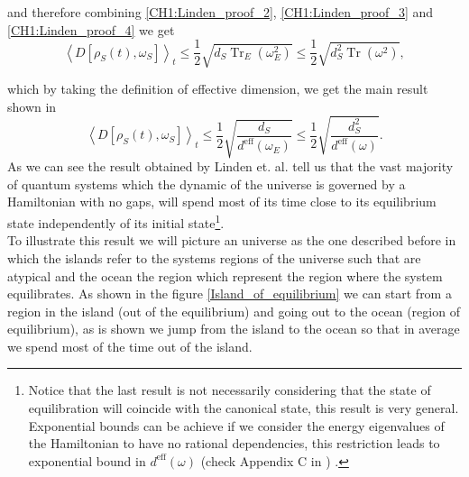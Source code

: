 and therefore combining \eqref{CH1:Linden_proof_2}, \eqref{CH1:Linden_proof_3} and \eqref{CH1:Linden_proof_4} we get
\begin{equation}
\left\langle D\left[\rho_{S}(t), \omega_{S}\right]\right\rangle_{t} \leq \frac{1}{2} \sqrt{d_{S} \operatorname{Tr}_{E}\left(\omega_{E}^{2}\right)} \leq \frac{1}{2} \sqrt{d_{S}^{2} \operatorname{Tr}\left(\omega^{2}\right)},
\label{CH1:Inequality_last}
\end{equation}

which by taking the definition of effective dimension, we get the main result shown in \cite{linden_quantum_2009}
\begin{equation}
\left\langle D\left[\rho_{S}(t), \omega_{S}\right]\right\rangle_{t} \leq \frac{1}{2} \sqrt{\frac{d_{S}}{d^{\mathrm{eff}}\left(\omega_{E}\right)}} \leq \frac{1}{2} \sqrt{\frac{d_{S}^{2}}{d^{\mathrm{eff}}(\omega) }}.
\label{CH1:Result_linden}
\end{equation}
As we can see the result obtained by Linden et. al. tell us that the vast majority of quantum systems which the dynamic of the universe is governed by a Hamiltonian with no gaps, will spend most of its time close to its equilibrium state independently of its initial state\footnote{Notice that the last result is not necessarily considering that the state of equilibration will coincide with the canonical state, this result is very general. Exponential bounds can be achieve if we consider the energy eigenvalues of the Hamiltonian to have no rational dependencies, this restriction leads to exponential bound in $d^{\mathrm{eff}}(\omega)$ (check Appendix C in \cite{linden_quantum_2009}) . }.\\
To illustrate this result we will picture an universe as the one described before in which the islands refer to the systems regions of the universe such that are atypical and the ocean the region which represent the region where the system equilibrates. As shown in the figure 
\ref{Island_of_equilibrium} we can start from a region in the island (out of the equilibrium) and going out to the ocean (region of equilibrium), as is shown we jump from the island to the ocean so that in average we spend most of the time out of the island.

